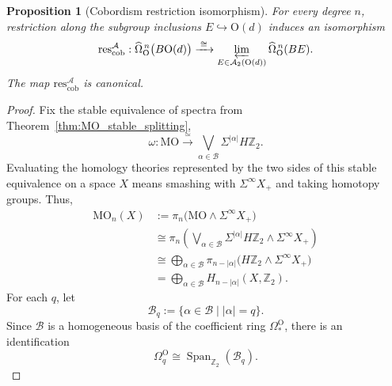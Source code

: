\documentclass[aps,prx,reprint,superscriptaddress,twocolumn,amsmath,amssymb,amsfonts, nofootinbib]{revtex4-2}
\newcommand{\res}{\text{res}}
\theoremstyle{apsstyle}
\newtheorem{proposition}[theorem]{Proposition}
\begin{document}
\bigskip  

\begin{proposition}[Cobordism restriction isomorphism]
\label{prop:cobordism_restriction_isomorphism}
For every degree $n$, restriction along the subgroup inclusions $E\hookrightarrow\mathrm O(d)$ induces an isomorphism
\begin{equation}
    \res^{\mathcal A}_{\mathrm{cob}}:
    \widehat{\Omega}_{\mathrm O}^{\,n}
    \bigl(B\mathrm O(d)\bigr)
    \xrightarrow{\;\cong\;}
    \varprojlim_{E\in\mathcal A_2(\mathrm O(d))}
    \widehat{\Omega}_{\mathrm O}^{\,n}(BE).
    \label{eq:quillen_cob}
\end{equation}
The map $\res^{\mathcal A}_{\mathrm{cob}}$ is canonical.
\end{proposition}

\begin{proof}
Fix the stable equivalence of spectra from
Theorem~\ref{thm:MO_stable_splitting},
\begin{equation*}
    \omega:
    \mathrm{MO}
    \xrightarrow{\;\simeq\;}
    \bigvee_{\alpha\in\mathcal B}
    \Sigma^{|\alpha|}H\mathbb Z_2.
\end{equation*}
Evaluating the homology theories represented by the two sides of this
stable equivalence on a space $X$ means smashing with
$\Sigma^\infty X_+$ and taking homotopy groups. Thus,
\begin{align}
    \mathrm{MO}_n(X)
    &:=
    \pi_n\bigl(
        \mathrm{MO}\wedge\Sigma^\infty X_+
    \bigr)
    \nonumber\\
    &\cong
    \pi_n\left(\bigvee_{\alpha\in\mathcal B}
        \Sigma^{|\alpha|}H\mathbb Z_2
        \wedge\Sigma^\infty X_+ \right)
    \nonumber\\
    &\cong \bigoplus_{\alpha\in\mathcal B} \pi_{n-|\alpha|}
    \bigl( H\mathbb Z_2\wedge\Sigma^\infty X_+ \bigr)
    \nonumber\\
    &= \bigoplus_{\alpha\in\mathcal B} H_{n-|\alpha|}(X,\mathbb Z_2).
    \label{eq:MO_homology_from_splitting}
\end{align}
For each $q$, let
\begin{equation*}
    \mathcal B_q := \{\alpha\in\mathcal B\mid |\alpha|=q\}.
\end{equation*}
Since $\mathcal B$ is a homogeneous basis of the coefficient ring $\Omega_*^{\mathrm O}$, there is an identification
\begin{equation*}
    \Omega_q^{\mathrm O} \cong
    \operatorname{Span}_{\mathbb Z_2}(\mathcal B_q).
\end{equation*}

\end{proof}
\end{document}
